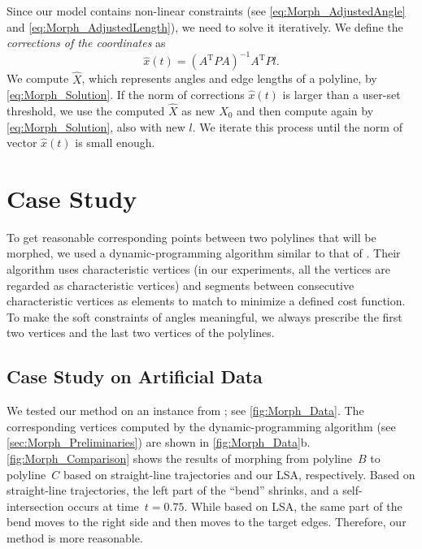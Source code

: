 Since our model contains non-linear constraints
(see \eqs\ref{eq:Morph_AdjustedAngle}
and \ref{eq:Morph_AdjustedLength}), 
we need to solve it iteratively.
We define the \emph{corrections of the coordinates} as
\begin{equation}
\label{eq:Morph_CoordinatesCorrections}
\hat{x}(t)= (A^\mathrm{T}PA)^{-1}A^\mathrm{T}Pl.
\end{equation}
We compute $\hat{X}$,
which represents angles and edge lengths of a polyline,
by \eq\ref{eq:Morph_Solution}.
If the norm of corrections $\hat{x}(t)$ 
is larger than a user-set threshold,
we use the computed $\hat{X}$ as new $X_0$ 
and then compute again by \eq\ref{eq:Morph_Solution}, 
also with new $l$.
We iterate this process until 
the norm of vector $\hat{x}(t)$ is small enough.


\section{Case Study}
\label{case-study}

To get reasonable corresponding points between two polylines 
that will be morphed, 
we used a dynamic-programming algorithm 
similar to that of \textcite{Noellenburg2008}. 
Their algorithm uses characteristic vertices 
(in our experiments, 
all the vertices are regarded as characteristic vertices) 
and segments between consecutive characteristic vertices 
as elements to match to minimize a defined cost function. 
To make the soft constraints of angles meaningful, 
we always prescribe the first two vertices 
and the last two vertices of the polylines.

\subsection{Case Study on Artificial Data}
\label{case-study-on-artificial-data}

We tested our method on an instance from \textcite{Bereg2005};
see \fig\ref{fig:Morph_Data}.
The corresponding vertices computed 
by the dynamic-programming algorithm
(see \sect\ref{sec:Morph_Preliminaries})
are shown in \fig\ref{fig:Morph_Data}b.
\fig\ref{fig:Morph_Comparison} 
shows the results of morphing 
from polyline~$B$ to polyline~$C$ based on
straight-line trajectories and our LSA, respectively. 
Based on straight-line trajectories, 
the left part of the ``bend'' shrinks, 
and a self-intersection occurs at time~$t = 0.75$. 
While based on LSA, the same part of the bend moves
to the right side and then moves to the target edges. 
Therefore, our method is more reasonable.


